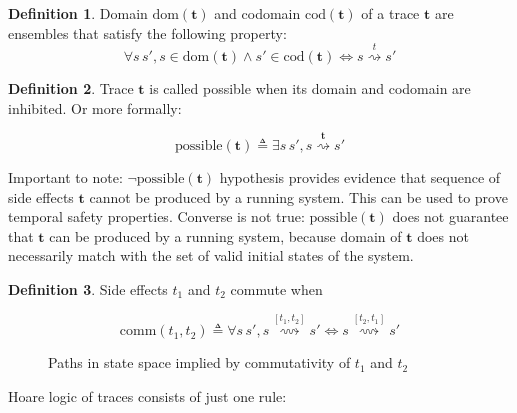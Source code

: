 \documentclass[10pt,letterpaper]{article}
\newcommand \dom[1]{\text{dom}\left(#1\right)}
\newcommand \cod[1]{\text{cod}\left(#1\right)}
\newcommand \chain[3]{\mathrel{#1\stackrel{#3}{\rightsquigarrow}#2}}
\newcommand \bm[1]{\boldsymbol{#1}}
\newcommand \comm[2]{\mathrel{\text{comm}\left(#1,#2\right)}}
\newcommand \possible[1]{\mathrel{\text{possible}\left({#1}\right)}}
\theoremstyle{definition}
\newtheorem{definition}{Definition}
\begin{document}
\begin{definition}
  Domain $\dom{\bm{t}}$ and codomain $\cod{\bm{t}}$ of a trace
  $\bm{t}$ are ensembles that satisfy the following property:
  \begin{equation}
    \forall s\, s', s \in \dom{\bm{t}} \land s' \in \cod{\bm{t}} \iff
    \chain{s}{s'}{t}
  \end{equation}

\end{definition}

\begin{definition}
  Trace $\bm{t}$ is called possible when its domain and codomain are
  inhibited. Or more formally:

  \begin{equation}
    \possible{\bm{t}} \triangleq \exists s\, s', \chain{s}{s'}{\bm{t}}
  \end{equation}
\end{definition}

Important to note: $\neg \possible{\bm{t}}$ hypothesis provides
evidence that sequence of side effects $\bm{t}$ cannot be produced by
a running system. This can be used to prove temporal safety
properties. Converse is not true: $\possible{\bm{t}}$ does not
guarantee that $\bm{t}$ can be produced by a running system, because
domain of $\bm{t}$ does not necessarily match with the set of valid
initial states of the system.

\begin{definition}
Side effects $t_1$ and $t_2$ commute when

\begin{equation}
\comm{t_1}{t_2} \triangleq \forall s\,s', \chain{s}{s'}{[t_1,t_2]} \iff \chain{s}{s'}{[t_2,t_1]}
\end{equation}
\end{definition}
\begin{figure}
  \centering
  \caption{Paths in state space implied by commutativity of $t_1$ and $t_2$}
  \label{fig:comm}
\end{figure}

Hoare logic of traces consists of just one rule:
\end{document}
